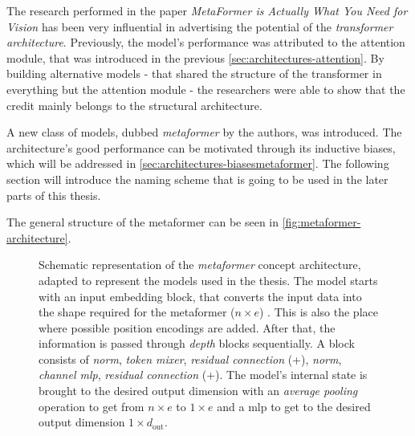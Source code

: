 The research performed in the paper \emph{MetaFormer is Actually What You Need for Vision} \cite{metaformerPaper} has been very influential in advertising the potential of the \emph{transformer architecture}.
Previously, the model's performance was attributed to the attention module, that was introduced in the previous \autoref{sec:architectures-attention}. 
By building alternative models - that shared the structure of the transformer in everything but the attention module - the researchers were able to show that the credit mainly belongs to the structural architecture.

A new class of models, dubbed \emph{metaformer} by the authors, was introduced. 
The architecture's good performance can be motivated through its inductive biases, which will be addressed in \autoref{sec:architectures-biasesmetaformer}.
The following section will introduce the naming scheme that is going to be used in the later parts of this thesis.

The general structure of the metaformer can be seen in \autoref{fig:metaformer-architecture}.

\begin{figure}[htbp]
    \centering
    \caption{Schematic representation of the \emph{metaformer} concept architecture, adapted to represent the models used in the thesis. 
    The model starts with an input embedding block, that converts the input data into the shape required for the metaformer ($n\times e$) \cite{imageWorth16x16}. This is also the place where possible position encodings are added. 
    After that, the information is passed through \emph{depth} blocks sequentially. 
    A block consists of \emph{norm}, \emph{token mixer}, \emph{residual connection} (+), 
    \emph{norm}, \emph{channel mlp}, \emph{residual connection} (+).
    The model's internal state is brought to the desired output dimension with an \emph{average pooling} operation to get from $n \times e$ to $1 \times e$ and a mlp to get to the desired output dimension $1 \times d_\mathrm{out}$.
    }
    \label{fig:metaformer-architecture}
\end{figure}

